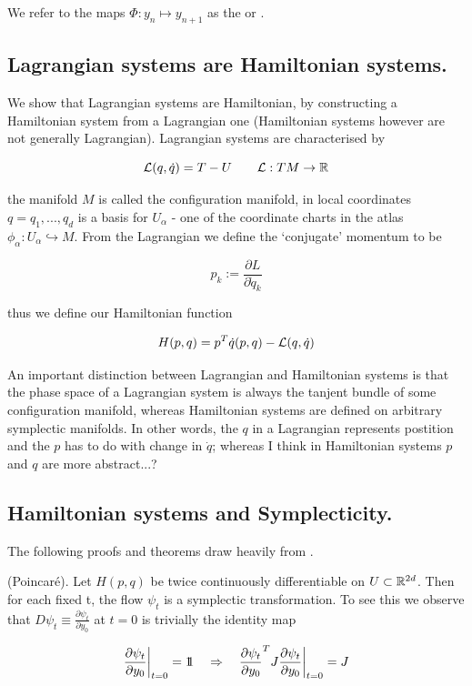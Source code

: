 \documentclass[12pt]{article}
\begin{document}
We refer to the maps $\Phi : y_n\mapsto y_{n+1}$ as the  or . 

\subsection{Lagrangian systems are Hamiltonian systems.}
We show that Lagrangian systems are Hamiltonian, by constructing a Hamiltonian system from a Lagrangian one (Hamiltonian systems however are not generally Lagrangian). Lagrangian systems are characterised by

$$
\mathcal L(q,\dot q) = T - U\qquad \mathcal L : TM \to \mathbb{R}
$$

the manifold $M$ is called the configuration manifold, in local coordinates $q = q_1,...,q_d$ is a basis for $U_\alpha$ - one of the coordinate charts in the atlas $\phi_\alpha : U_\alpha\hookrightarrow M$. From the Lagrangian we define the `conjugate' momentum to be

$$
p_k := \frac{\partial L}{\partial \dot q_k}
$$

thus we define our Hamiltonian function 

$$
H(p,q) = p^T\dot q(p,q) - \mathcal L(q,\dot q)
$$

An important distinction between Lagrangian and Hamiltonian systems is that the phase space of a Lagrangian system is always the tanjent bundle of some configuration manifold, whereas Hamiltonian systems are defined on arbitrary symplectic manifolds. In other words, the $q$ in a Lagrangian represents postition and the $p$ has to do with change in $\dot q$; whereas I think in Hamiltonian systems $p$ and $q$ are more abstract...?


\subsection{Hamiltonian systems and Symplecticity.}

The following proofs and theorems draw heavily from \cite{Numerical}.

 (Poincar\'e). Let $H(p,q)$ be twice continuously differentiable on $U\subset \mathbb{R}^{2d}$. Then for each fixed t, the flow $\psi_t$ is a symplectic transformation. To see this we observe that $D\psi_t \equiv \frac{\partial \psi_t}{\partial y_0}$ at $t=0$ is trivially the identity map

\begin{equation}\label{eq:time flow jacobian at t=0}
\frac{\partial \psi_t}{\partial y_0}\bigg|_{t=0} = 1\!\!1 \quad\Rightarrow\quad \frac{\partial \psi_t}{\partial y_0}^T J \frac{\partial \psi_t}{\partial y_0}\bigg|_{t=0} = J
\end{equation}
\end{document}
